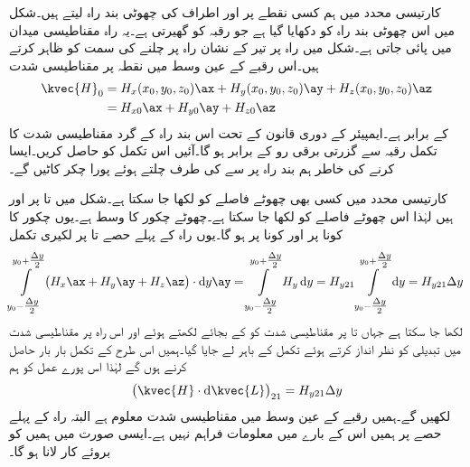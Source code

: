 کارتیسی محدد میں ہم کسی نقطے  پر   اور  اطراف کی چھوٹی بند راہ لیتے ہیں۔شکل  میں اس چھوٹی بند راہ کو دکھایا گیا ہے جو رقبہ  کو گھیرتی ہے۔یہ راہ مقناطیسی میدان  میں پائی جاتی ہے۔شکل میں راہ پر تیر کے نشان راہ پر چلنے کی سمت کو ظاہر کرتے  ہیں۔اس رقبے کے عین وسط میں نقطہ  پر مقناطیسی شدت 
\begin{align*}
\kvec{H}_0&=H_x(x_0,y_0,z_0)\ax+H_y(x_0,y_0,z_0)\ay+H_z(x_0,y_0,z_0)\az\\
&=H_{x0}\ax+H_{y0}\ay+H_{z0}\az
\end{align*}
کے برابر ہے۔ایمپیئر کے دوری قانون کے تحت اس بند راہ کے گرد مقناطیسی شدت کا تکمل رقبہ  سے گزرتی برقی رو کے برابر ہو گا۔آئیں اس تکمل کو حاصل کریں۔ایسا کرنے کی خاطر ہم بند راہ پر سے  کی طرف چلتے ہوئے پورا چکر کاٹیں گے۔

کارتیسی محدد میں کسی بھی چھوٹے فاصلے کو  لکھا جا سکتا ہے۔شکل  میں  تا  پر  اور  ہیں لہٰذا اس چھوٹے فاصلے کو  لکھا جا سکتا ہے۔چھوٹے چکور کا وسط  ہے۔یوں چکور کا  کونا  پر اور  کونا  پر ہو گا۔یوں راہ کے پہلے حصے  تا  پر لکیری تکمل
\begin{align*}
\int\limits_{y_0-\tfrac{\Delta y}{2}}^{y_0+\tfrac{\Delta y}{2}}\left(H_x \ax+H_y\ay+H_z\az \right) \cdot \dif y \ay=\int\limits_{y_0-\tfrac{\Delta y}{2}}^{y_0+\tfrac{\Delta y}{2}}H_y  \dif y =H_{y21}\int\limits_{y_0-\tfrac{\Delta y}{2}}^{y_0+\tfrac{\Delta y}{2}}  \dif y=H_{y21}\Delta y
\end{align*}
لکھا جا سکتا ہے جہاں  تا  پر مقناطیسی شدت کو  کے بجائے  لکھتے ہوئے اور اس راہ پر مقناطیسی شدت میں تبدیلی کو نظر انداز کرتے ہوئے  تکمل کے باہر لے جایا گیا۔ہمیں اس طرح کے تکمل بار بار حاصل کرنے ہوں گے لہٰذا اس پورے عمل کو ہم
\begin{align}\label{مساوات_مقناطیسی_پہلے_حصہ_تکمل}
\left( \kvec{H} \cdot \dif \kvec{L}\right)_{21}=H_{y21} \Delta y 
\end{align}
لکھیں گے۔ہمیں رقبے کے عین وسط میں مقناطیسی شدت معلوم ہے البتہ راہ کے پہلے حصے پر ہمیں اس کے بارے میں معلومات فراہم نہیں ہے۔ایسی صورت میں ہمیں  کو بروئے کار لانا ہو گا۔

